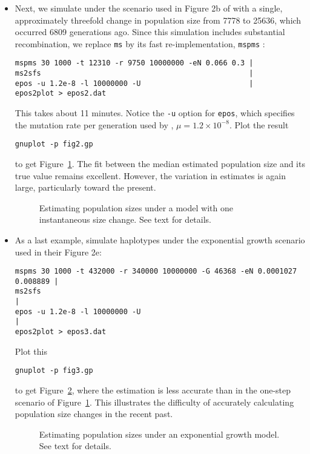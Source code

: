 \documentclass[a4paper, english]{article}
\newcommand{\ty}{\texttt}
\begin{document}
\begin{itemize}
\item Next, we simulate under the scenario used in Figure 2b of \cite{liu15:exp}
  with a single, approximately threefold change in population size
  from 7778 to 25636, which occurred 6809 generations ago. Since this simulation includes substantial recombination, we
  replace \ty{ms} by its fast re-implementation, \ty{mspms}
  \citep{kel16:eff}:
\begin{verbatim}
mspms 30 1000 -t 12310 -r 9750 10000000 -eN 0.066 0.3 |
ms2sfs                                                |
epos -u 1.2e-8 -l 10000000 -U                         |
epos2plot > epos2.dat
\end{verbatim}
This takes about 11 minutes. Notice the \ty{-u} option for \ty{epos},
which specifies the mutation rate per generation used by \cite{liu15:exp}, $\mu=1.2\times
10^{-8}$. Plot the result
\begin{verbatim}
gnuplot -p fig2.gp
\end{verbatim}
to get Figure~\ref{fig:2b}. The fit between the median estimated
population size and its true value remains excellent. However, the
variation in estimates is again large, particularly toward the present.
\begin{figure}
  \begin{center}
    \scalebox{0.6}{}
  \end{center}
  \caption{Estimating population sizes under a model with one
    instantaneous size change. See text for details.}\label{fig:2b}
\end{figure}
\item As a last example, simulate haplotypes under
  the exponential growth scenario \cite{liu15:exp} used in their
  Figure 2e:
    \small
\begin{verbatim}
mspms 30 1000 -t 432000 -r 340000 10000000 -G 46368 -eN 0.0001027 0.008889 |
ms2sfs                                                                     |
epos -u 1.2e-8 -l 10000000 -U                                              |
epos2plot > epos3.dat
\end{verbatim}
\normalsize
Plot this
\begin{verbatim}
gnuplot -p fig3.gp
\end{verbatim}
to get Figure~\ref{fig:2e}, where the estimation is less
accurate than in the one-step scenario of Figure~\ref{fig:2b}.
This illustrates the difficulty of accurately calculating population size
changes in the recent past.
\begin{figure}
  \begin{center}
    \scalebox{0.6}{}
  \end{center}
  \caption{Estimating population sizes under an exponential growth
    model. See text for details.}\label{fig:2e}
\end{figure}
\end{itemize}
\end{document}
